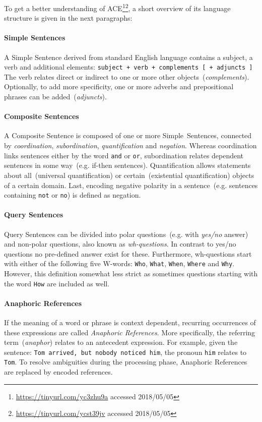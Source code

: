 \documentclass[draft,final]{vutinfth} %
\begin{document}
To get a better understanding of ACE\footnote{\url{https://tinyurl.com/yc3zhu9a} accessed 2018/05/05}\footnote{\url{https://tinyurl.com/ycst39jv} accessed 2018/05/05}, a short overview of its language structure is given in the next paragraphs:
 
\paragraph{Simple Sentences} A Simple Sentence derived from standard English language contains a subject, a verb and additional elements: \texttt{subject + verb + complements [ + adjuncts ]} The verb relates direct or indirect to one or more other objects~(\textit{complements}). Optionally, to add more specificity, one or more adverbs and prepositional phrases can be added~(\textit{adjuncts}). 

\paragraph{Composite Sentences} A Composite Sentence is composed of one or more Simple~Sentences, connected by \textit{coordination},
\textit{subordination}, \textit{quantification} and \textit{negation}. Whereas coordination links sentences either by the word \texttt{and} or \texttt{or}, subordination relates dependent sentences in some way~(e.g. if-then sentences). Quantification allows statements about all~(universal quantification) or certain~(existential quantification) objects of a certain domain. Last, encoding negative polarity in a sentence~(e.g. sentences containing \texttt{not} or \texttt{no}) is defined as negation. 

\paragraph{Query Sentences} Query Sentences can be divided into polar questions~(e.g. with \textit{yes/no} answer) and non-polar questions, also known as \emph{wh-questions}. In contrast to yes/no questions no pre-defined answer exist for these. Furthermore, wh-questions start with either of the following five W-words: \texttt{Who}, \texttt{What}, \texttt{When}, \texttt{Where} and \texttt{Why}. However, this definition somewhat less strict as sometimes questions starting with the word \texttt{How} are included as well.

\paragraph{Anaphoric References} If the meaning of a word or phrase is context dependent, recurring occurrences of these expressions are called \textit{Anaphoric References}. More specifically, the referring term~(\textit{anaphor}) relates to an antecedent expression. For example, given the sentence: \texttt{Tom arrived, but nobody noticed him}, the pronoun \texttt{him} relates to \texttt{Tom}. To resolve ambiguities during the processing phase, Anaphoric References are replaced by encoded references. 
\end{document}
